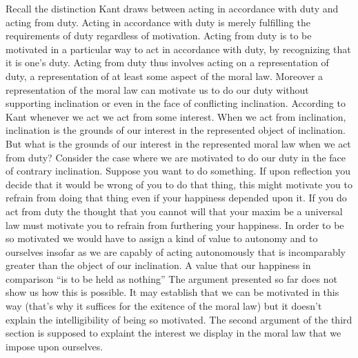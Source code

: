 Recall the distinction Kant draws between acting in accordance with duty and acting from duty. Acting in accordance with duty is merely fulfilling the requirements of duty regardless of motivation. Acting from duty is to be motivated in a particular way to act in accordance with duty, by recognizing that it is one’s duty. Acting from duty thus involves acting on a representation of duty, a representation of at least some aspect of the moral law. Moreover a representation of the moral law can motivate us to do our duty without supporting inclination or even in the face of conflicting inclination. According to Kant whenever we act we act from some interest. When we act from inclination, inclination is the grounds of our interest in the represented object of inclination. But what is the grounds of our interest in the represented moral law when we act from duty? Consider the case where we are motivated to do our duty in the face of contrary inclination. Suppose you want to do something. If upon reflection you decide that it would be wrong of you to do that thing, this might motivate you to refrain from doing that thing even if your happiness depended upon it. If you do act from duty the thought that you cannot will that your maxim be a universal law must motivate you to refrain from furthering your happiness. In order to be so motivated we would have to assign a kind of value to autonomy and to ourselves insofar as we are capably of acting autonomously that is incomparably greater than the object of our inclination. A value that our happiness in comparison ``is to be held as nothing'' The argument presented so far does not show us how this is possible. It may establish that we can be motivated in this way (that’s why it suffices for the exitence of the moral law) but it doesn’t explain the intelligibility of being so motivated. The second argument of the third section is supposed to explaint the interest we display in the moral law that we impose upon ourselves. \change

